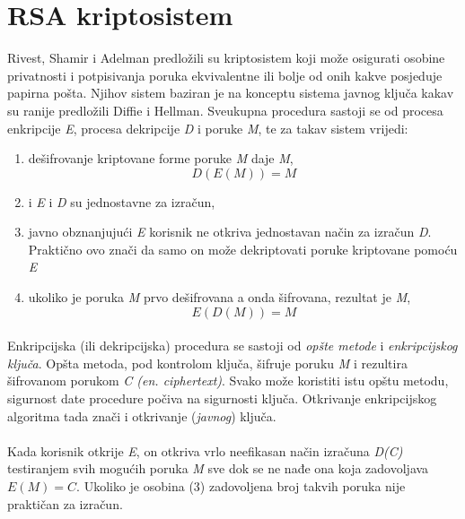 \section{RSA kriptosistem}
Rivest, Shamir i Adelman\cite{rivest1978method} predložili su kriptosistem koji može osigurati osobine privatnosti i potpisivanja poruka ekvivalentne ili bolje od onih kakve posjeduje papirna pošta. Njihov sistem baziran je na konceptu sistema javnog ključa kakav su ranije predložili Diffie i Hellman\cite{diffie1976new}. Sveukupna procedura sastoji se od procesa enkripcije \textit{E}, procesa dekripcije \textit{D} i poruke \textit{M}, te za takav sistem vrijedi:

\begin{enumerate}
  \item dešifrovanje kriptovane forme poruke \textit{M} daje \textit{M}, \[D(E(M)) = M\]
  \item i \textit{E} i \textit{D} su jednostavne za izračun,
  \item javno obznanjujući \textit{E} korisnik ne otkriva jednostavan način za izračun \textit{D}. Praktično ovo znači da samo on može dekriptovati poruke kriptovane pomoću \textit{E}
  \item ukoliko je poruka \textit{M} prvo dešifrovana a onda šifrovana, rezultat je \textit{M}, \[E(D(M)) = M\]
\end{enumerate}

\paragraph*{}
Enkripcijska (ili dekripcijska) procedura se sastoji od \textit{opšte metode} i \textit{enkripcijskog ključa}. Opšta metoda, pod kontrolom ključa, šifruje poruku \textit{M} i rezultira šifrovanom porukom \textit{C (en. ciphertext)}. Svako može koristiti istu opštu metodu, sigurnost date procedure počiva na sigurnosti ključa. Otkrivanje enkripcijskog algoritma tada znači i otkrivanje (\textit{javnog}) ključa.

\paragraph*{}
Kada korisnik otkrije \textit{E}, on otkriva vrlo neefikasan način izračuna \textit{D(C)} testiranjem svih mogućih poruka \textit{M} sve dok se ne nađe ona koja zadovoljava \(E(M) = C\). Ukoliko je osobina (3) zadovoljena broj takvih poruka nije praktičan za izračun.

